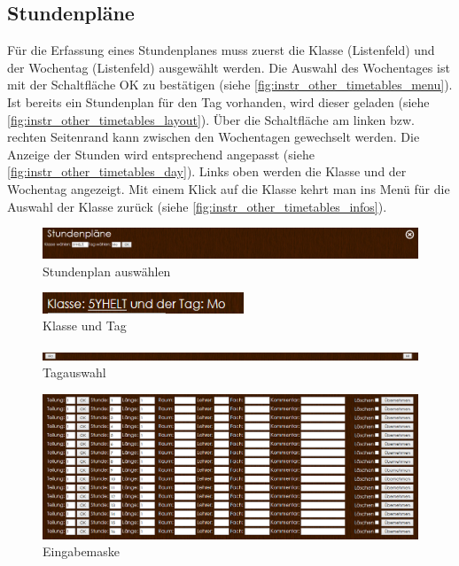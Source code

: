 \subsection{Stundenpläne}
Für die Erfassung eines Stundenplanes muss zuerst die Klasse (Listenfeld) und der Wochentag (Listenfeld) ausgewählt werden. Die Auswahl des Wochentages ist mit der Schaltfläche OK zu bestätigen (siehe \autoref{fig:instr_other_timetables_menu}). Ist bereits ein Stundenplan für den Tag vorhanden, wird dieser geladen (siehe \autoref{fig:instr_other_timetables_layout}). Über die Schaltfläche am linken bzw. rechten Seitenrand kann zwischen den Wochentagen gewechselt werden. Die Anzeige der Stunden wird entsprechend angepasst (siehe \autoref{fig:instr_other_timetables_day}).
Links oben werden die Klasse und der Wochentag angezeigt. Mit einem Klick auf die Klasse kehrt man ins Menü für die Auswahl der Klasse zurück (siehe \autoref{fig:instr_other_timetables_infos}).
\begin{figure}[H]
\centering
\includegraphics[keepaspectratio=true, width=14cm]{images/screenshots/timetables_input_menu.png}
\caption{Stundenplan auswählen}
\label{fig:instr_other_timetables_menu}
\end{figure}
\begin{figure}[H]
\centering
\includegraphics[keepaspectratio=true, width=6cm]{images/screenshots/timetables_input_infos.png}
\caption{Klasse und Tag}
\label{fig:instr_other_timetables_infos}
\end{figure}
\begin{figure}[H]
\centering
\includegraphics[keepaspectratio=true, width=14cm]{images/screenshots/timetables_input_day.png}
\caption{Tagauswahl}
\label{fig:instr_other_timetables_day}
\end{figure}
\begin{figure}[H]
\centering
\includegraphics[keepaspectratio=true, width=14cm]{images/screenshots/timetables_input_layout.png}
\caption{Eingabemaske}
\label{fig:instr_other_timetables_layout}
\end{figure}
